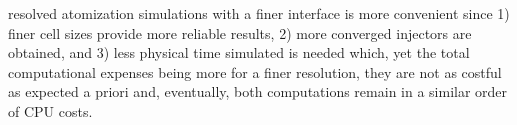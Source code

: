 resolved atomization simulations with a finer interface is more convenient since 1) finer cell sizes provide more reliable results, 2) more converged injectors are obtained, and 3) less physical time simulated is needed which, yet the total computational expenses being more for a finer resolution, they are not as costful as expected a priori and, eventually, both computations remain in a similar order of CPU costs.

